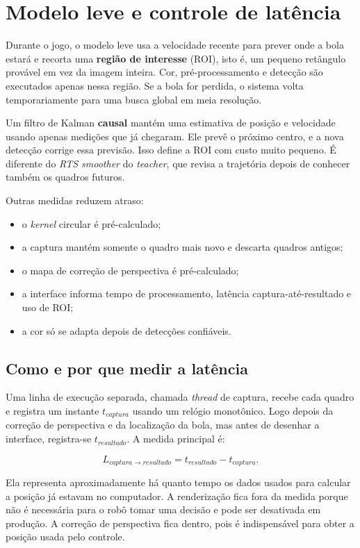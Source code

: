 \documentclass[11pt,a4paper]{article}
\begin{document}
\section{Modelo leve e controle de latência}

Durante o jogo, o modelo leve usa a velocidade recente para prever onde a bola estará e
recorta uma \textbf{região de interesse} (ROI), isto é, um pequeno retângulo provável em vez
da imagem inteira. Cor, pré-processamento e detecção são
executados apenas nessa região. Se a bola for perdida, o sistema volta temporariamente para
uma busca global em meia resolução.

Um filtro de Kalman \textbf{causal} mantém uma estimativa de posição e velocidade usando
apenas medições que já chegaram. Ele prevê o próximo centro, e a nova detecção corrige essa
previsão. Isso define a ROI com custo muito pequeno. É diferente do \textit{RTS smoother} do
\textit{teacher}, que revisa a trajetória depois de conhecer também os quadros futuros.

Outras medidas reduzem atraso:

\begin{itemize}
  \item o \textit{kernel} circular é pré-calculado;
  \item a captura mantém somente o quadro mais novo e descarta quadros antigos;
  \item o mapa de correção de perspectiva é pré-calculado;
  \item a interface informa tempo de processamento, latência captura-até-resultado e uso de ROI;
  \item a cor só se adapta depois de detecções confiáveis.
\end{itemize}

\subsection{Como e por que medir a latência}

Uma linha de execução separada, chamada \emph{thread} de captura, recebe cada quadro e
registra um instante $t_{captura}$ usando um relógio monotônico. Logo depois da correção de
perspectiva e da localização da bola, mas antes de desenhar a interface, registra-se
$t_{resultado}$. A medida principal é:

\[
  L_{captura\rightarrow resultado} = t_{resultado} - t_{captura}.
\]

Ela representa aproximadamente há quanto tempo os dados usados para calcular a posição já
estavam no computador. A renderização fica fora da medida porque não é necessária para
o robô tomar uma decisão e pode ser desativada em produção. A correção de perspectiva fica
dentro, pois é indispensável para obter a posição usada pelo controle.
\end{document}

